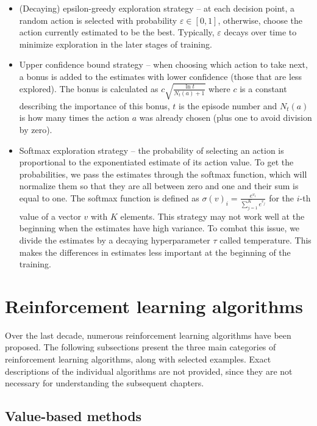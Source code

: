 \documentclass[
  digital,     %
  oneside,     %
  nosansbold,  %
  nocolorbold, %
  lof,         %
  lot,         %
]{fithesis4}
\begin{document}
\begin{itemize}
    \item (Decaying) epsilon-greedy exploration strategy -- at each decision point, a random action is selected with probability $\varepsilon \in [0,1]$, otherwise, choose the action currently estimated to be the best. Typically, $\varepsilon$ decays over time to minimize exploration in the later stages of training.
    \item Upper confidence bound strategy -- when choosing which action to take next, a bonus is added to the estimates with lower confidence (those that are less explored). The bonus is calculated as $c\sqrt{\frac{\ln{t}}{N_t(a)+1}}$ where $c$ is a constant describing the importance of this bonus, $t$ is the episode number and $N_t(a)$ is how many times the action $a$ was already chosen (plus one to avoid division by zero).
    \item Softmax exploration strategy -- the probability of selecting an action is proportional to the exponentiated estimate of its action value. To get the probabilities, we pass the estimates through the softmax function, which will normalize them so that they are all between zero and one and their sum is equal to one. The softmax function is defined as $\sigma (v)_i = \frac{e^{v_i}}{\sum^{K}_{j=1}e^{v_j}}$ for the $i$-th value of a vector $v$ with $K$ elements. This strategy may not work well at the beginning when the estimates have high variance. To combat this issue, we divide the estimates by a decaying hyperparameter $\tau$ called temperature. This makes the differences in estimates less important at the beginning of the training.
\end{itemize}



\section{Reinforcement learning algorithms}
\label{sec:algos}

Over the last decade, numerous reinforcement learning algorithms have been proposed. The following subsections present the three main categories of reinforcement learning algorithms, along with selected examples. Exact descriptions of the individual algorithms are not provided, since they are not necessary for understanding the subsequent chapters.

\subsection{Value-based methods}
\label{subsec:value-based-methods}
\end{document}
